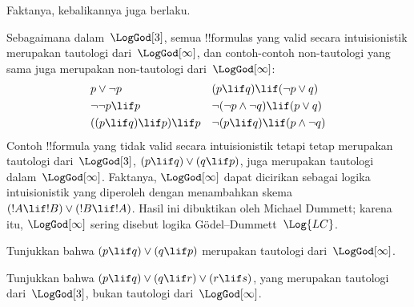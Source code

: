 \documentclass[../../../include/open-logic-section]{subfiles}
\begin{document}
Faktanya, kebalikannya juga berlaku.

Sebagaimana dalam~$\LogGod[3]$, semua !!{formula}s yang valid secara
intuisionistik merupakan tautologi dari~$\LogGod[\infty]$, dan contoh-contoh
non-tautologi yang sama juga merupakan non-tautologi dari~$\LogGod[\infty]$:
\begin{align*}
  & p \lor \lnot p && (p \lif q) \lif (\lnot p \lor q) \\
  & \lnot\lnot p \lif p && \lnot(\lnot p \land \lnot q) \lif (p \lor q) \\
  & ((p \lif q) \lif p) \lif p && \lnot(p \lif q) \lif (p \land \lnot q)
\end{align*}
Contoh !!{formula} yang tidak valid secara intuisionistik tetapi tetap
merupakan tautologi dari~$\LogGod[3]$, $(p \lif q) \lor (q \lif p)$, juga
merupakan tautologi dalam~$\LogGod[\infty]$. Faktanya, $\LogGod[\infty]$
dapat dicirikan sebagai logika intuisionistik yang diperoleh dengan
menambahkan skema $(!A \lif !B) \lor (!B \lif !A)$. Hasil ini dibuktikan oleh
Michael Dummett; karena itu, $\LogGod[\infty]$ sering disebut logika
G\"odel--Dummett~$\Log{LC}$.

\begin{prob}
  Tunjukkan bahwa $(p \lif q) \lor (q \lif p)$ merupakan tautologi
  dari~$\LogGod[\infty]$.
\end{prob}

\begin{prob}
  Tunjukkan bahwa $(p \lif q) \lor (q \lif r) \lor (r \lif s)$, yang
  merupakan tautologi dari~$\LogGod[3]$, bukan tautologi
  dari~$\LogGod[\infty]$.
\end{prob}
\end{document}
